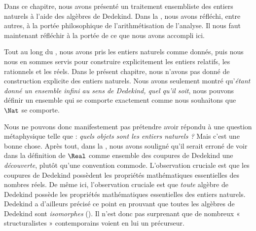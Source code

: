 \documentclass[../../../include/open-logic-section]{subfiles}
\begin{document}


Dans ce chapitre, nous avons présenté un traitement ensembliste des
entiers naturels à l'aide des algèbres de Dedekind. Dans la
, nous avons réfléchi, entre autres,
à la portée philosophique de l'arithmétisation de l'analyse.
%
%
Il nous faut maintenant réfléchir à la portée de ce que nous avons
accompli ici.

Tout au long du , nous avons pris
les entiers naturels comme donnés, puis nous nous en sommes servis pour
construire explicitement les entiers relatifs, les rationnels et les réels.
Dans le présent chapitre, nous n'avons pas donné de construction explicite
des entiers naturels. Nous avons seulement montré qu'\emph{étant donné
un ensemble infini au sens de Dedekind, quel qu'il soit}, nous pouvons
définir un ensemble qui se comporte exactement comme nous souhaitons
que~$\Nat$ se comporte.

Nous ne pouvons donc manifestement pas prétendre avoir répondu à une
question métaphysique telle que : \emph{quels objets sont les entiers
naturels ?} Mais c'est une bonne chose. Après tout, dans la
, nous avons souligné qu'il serait erroné
de voir dans la définition de $\Real$ comme ensemble des coupures de
Dedekind une \emph{découverte}, plutôt qu'une convention commode.
L'observation cruciale est que les coupures de Dedekind possèdent les
propriétés mathématiques essentielles des nombres réels. De même ici,
l'observation cruciale est que \emph{toute} algèbre de Dedekind possède
les propriétés mathématiques essentielles des entiers naturels.
Dedekind a d'ailleurs précisé ce point en prouvant que toutes les algèbres
de Dedekind sont \emph{isomorphes}
(\citeyear[théorèmes 132--3]{Dedekind1888}). Il n'est donc pas surprenant
que de nombreux « structuralistes » contemporains voient en lui
un précurseur.
\end{document}
